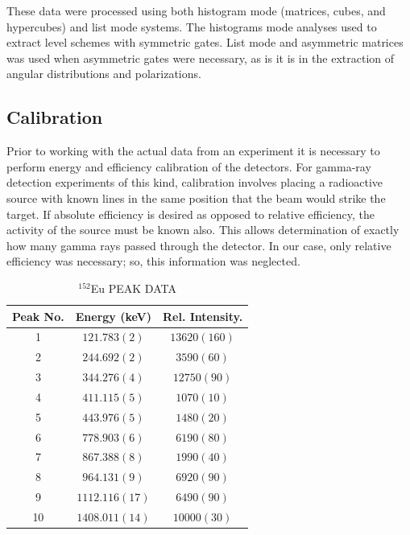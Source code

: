 These data were processed using both histogram mode (matrices, cubes, and hypercubes)\cite{radware} and list mode\cite{ROOT,blue} systems. The histograms mode analyses used to extract level schemes with symmetric gates. List mode and asymmetric matrices was used when asymmetric gates were necessary, as is it is in the extraction of angular distributions and polarizations.
 
\subsection{Calibration}
\label{ssec:exp-pr-data-proc-cal}
Prior to working with the actual data from an experiment it is necessary to perform energy and efficiency calibration of the detectors. For gamma-ray detection experiments of this kind, calibration involves placing a radioactive source with known lines in the same position that the beam would strike the target. If absolute efficiency is desired as opposed to relative efficiency, the activity of the source must be known also. This allows determination of exactly how many gamma rays passed through the detector. In our case, only relative efficiency was necessary; so, this information was neglected.

\begin{table}[hT!]
\caption{$^{152}$Eu PEAK DATA \label{tbl:152Eu-peaks}}
\begin{center}
\begin{tabular}{ccc}
\toprule
Peak No. & Energy (keV) & Rel. Intensity. \\ 
\midrule
1 & $121.783(2)$ & $13620(160)$ \\ 
2 & $244.692(2)$ & $3590(60)$ \\ 
3 & $344.276(4)$ & $12750(90)$ \\ 
4 & $411.115(5)$ & $1070(10)$ \\ 
5 & $443.976(5)$ & $1480(20)$ \\ 
6 & $778.903(6)$ & $6190(80)$ \\ 
7 & $867.388(8)$ & $1990(40)$ \\ 
8 & $964.131(9)$ & $6920(90)$ \\ 
9 & $1112.116(17)$ & $6490(90)$ \\ 
10 & $1408.011(14)$ & $10000(30)$ \\ 
\bottomrule
\end{tabular} 
\end{center}
\end{table}

